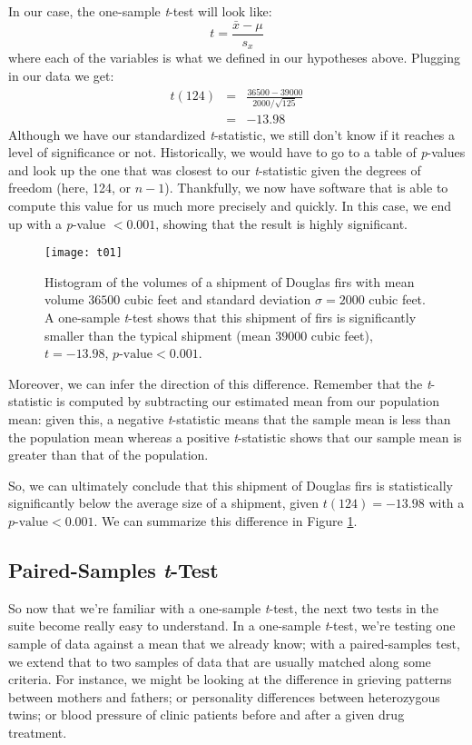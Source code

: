 In our case, the one-sample \textit{t}-test will look like:
\begin{equation}
t=\frac{\bar{x}-\mu}{s_x}
\end{equation}
where each of the variables is what we defined in our hypotheses above. Plugging in our data we get:
\begin{eqnarray*}
t(124)&=&\frac{36500-39000}{2000/\sqrt{125}} \\
&=& -13.98
\end{eqnarray*}
Although we have our standardized \textit{t}-statistic, we still don't know if it reaches a level of significance or not. Historically, we would have to go to a table of \textit{p}-values and look up the one that was closest to our \textit{t}-statistic given the degrees of freedom (here, 124, or $n-1$). Thankfully, we now have software that is able to compute this value for us much more precisely and quickly. In this case, we end up with a \textit{p}-value $< 0.001$, showing that the result is highly significant.

\begin{figure}[htp]
\texttt{[image: t01]}
\caption{Histogram of the volumes of a shipment of Douglas firs with mean volume $36500$ cubic feet and standard deviation $\sigma = 2000$ cubic feet. A one-sample \textit{t}-test shows that this shipment of firs is significantly smaller than the typical shipment (mean $39000$ cubic feet), $t=-13.98$, $p\text{-value}<0.001$.}
\label{fig:t01}
\end{figure}

Moreover, we can infer the direction of this difference. Remember that the \textit{t}-statistic is computed by subtracting our estimated mean from our population mean: given this, a negative \textit{t}-statistic means that the sample mean is less than the population mean whereas a positive \textit{t}-statistic shows that our sample mean is greater than that of the population.

So, we can ultimately conclude that this shipment of Douglas firs is statistically significantly below the average size of a shipment, given $t(124)=-13.98$ with a $p\text{-value} < 0.001$. We can summarize this difference in Figure \ref{fig:t01}.

\subsection{Paired-Samples \textit{t}-Test}

So now that we're familiar with a one-sample \textit{t}-test, the next two tests in the suite become really easy to understand. In a one-sample \textit{t}-test, we're testing one sample of data against a mean that we already know; with a paired-samples test, we extend that to two samples of data that are usually matched along some criteria. For instance, we might be looking at the difference in grieving patterns between mothers and fathers; or personality differences between heterozygous twins; or blood pressure of clinic patients before and after a given drug treatment.

